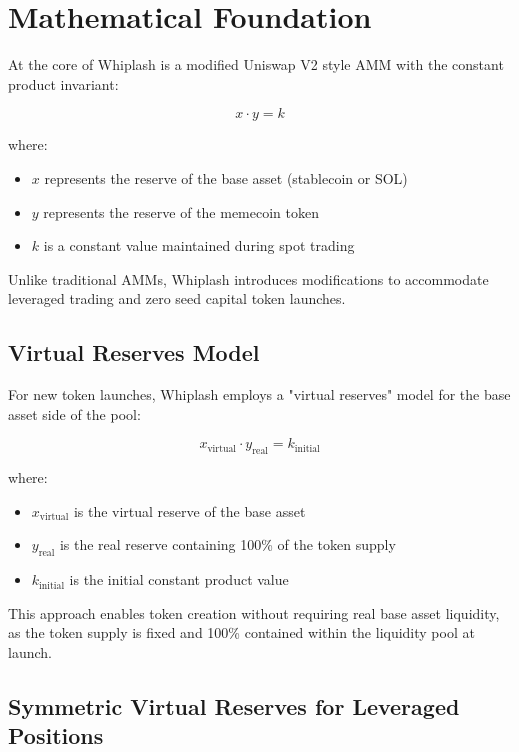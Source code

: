 \documentclass[11pt]{article}
\begin{document}
\section{Mathematical Foundation}

At the core of Whiplash is a modified Uniswap V2 style AMM with the constant product invariant:

\begin{equation}
x \cdot y = k
\end{equation}

where:
\begin{itemize}
    \item $x$ represents the reserve of the base asset (stablecoin or SOL)
    \item $y$ represents the reserve of the memecoin token
    \item $k$ is a constant value maintained during spot trading
\end{itemize}

Unlike traditional AMMs, Whiplash introduces modifications to accommodate leveraged trading and zero seed capital token launches.

\subsection{Virtual Reserves Model}

For new token launches, Whiplash employs a "virtual reserves" model for the base asset side of the pool:

\begin{equation}
x_{\text{virtual}} \cdot y_{\text{real}} = k_{\text{initial}}
\end{equation}

where:
\begin{itemize}
    \item $x_{\text{virtual}}$ is the virtual reserve of the base asset
    \item $y_{\text{real}}$ is the real reserve containing 100\% of the token supply
    \item $k_{\text{initial}}$ is the initial constant product value
\end{itemize}

This approach enables token creation without requiring real base asset liquidity, as the token supply is fixed and 100\% contained within the liquidity pool at launch.

\subsection{Symmetric Virtual Reserves for Leveraged Positions}
\end{document}
